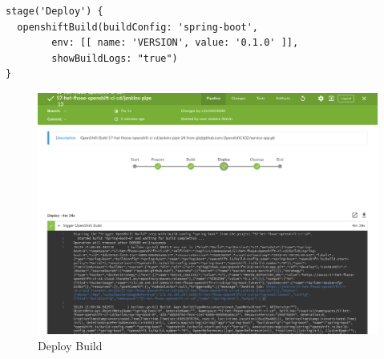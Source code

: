 \begin{verbatim}
stage('Deploy') {
  openshiftBuild(buildConfig: 'spring-boot', 
  		env: [[ name: 'VERSION', value: '0.1.0' ]], 
  		showBuildLogs: "true")
}
\end{verbatim}

\begin{figure}[H]
	\centering
	\includegraphics[scale=0.4]{image/jenkins-deploy.png}
	\caption{Deploy Build}
	\label{fig:architecture}
\end{figure}